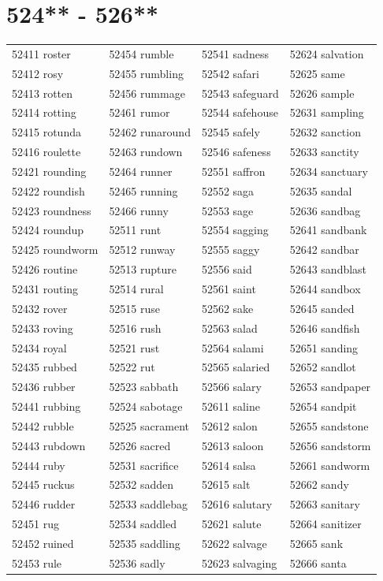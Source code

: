 \documentclass[10pt, oneside]{book}
\begin{document}
\begin{table}
	\centering
	\section*{524** - 526**}
	\begin{tabular}{l l l l}
52411 roster &52454 rumble &52541 sadness &52624 salvation\\
52412 rosy &52455 rumbling &52542 safari &52625 same\\
52413 rotten &52456 rummage &52543 safeguard &52626 sample\\
52414 rotting &52461 rumor &52544 safehouse &52631 sampling\\
52415 rotunda &52462 runaround &52545 safely &52632 sanction\\
52416 roulette &52463 rundown &52546 safeness &52633 sanctity\\
52421 rounding &52464 runner &52551 saffron &52634 sanctuary\\
52422 roundish &52465 running &52552 saga &52635 sandal\\
52423 roundness &52466 runny &52553 sage &52636 sandbag\\
52424 roundup &52511 runt &52554 sagging &52641 sandbank\\
52425 roundworm &52512 runway &52555 saggy &52642 sandbar\\
52426 routine &52513 rupture &52556 said &52643 sandblast\\
52431 routing &52514 rural &52561 saint &52644 sandbox\\
52432 rover &52515 ruse &52562 sake &52645 sanded\\
52433 roving &52516 rush &52563 salad &52646 sandfish\\
52434 royal &52521 rust &52564 salami &52651 sanding\\
52435 rubbed &52522 rut &52565 salaried &52652 sandlot\\
52436 rubber &52523 sabbath &52566 salary &52653 sandpaper\\
52441 rubbing &52524 sabotage &52611 saline &52654 sandpit\\
52442 rubble &52525 sacrament &52612 salon &52655 sandstone\\
52443 rubdown &52526 sacred &52613 saloon &52656 sandstorm\\
52444 ruby &52531 sacrifice &52614 salsa &52661 sandworm\\
52445 ruckus &52532 sadden &52615 salt &52662 sandy\\
52446 rudder &52533 saddlebag &52616 salutary &52663 sanitary\\
52451 rug &52534 saddled &52621 salute &52664 sanitizer\\
52452 ruined &52535 saddling &52622 salvage &52665 sank\\
52453 rule &52536 sadly &52623 salvaging &52666 santa\\
	\end{tabular}
 \end{table}
\clearpage
\end{document}

